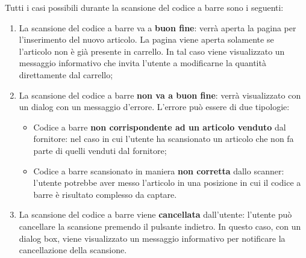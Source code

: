 Tutti i casi possibili durante la scansione del codice a barre sono i seguenti:
\begin{enumerate}
	\item La scansione del codice a barre va a \textbf{buon fine}: verrà aperta la pagina per l'inserimento del nuovo articolo. La pagina viene aperta
	solamente se l'articolo non è già presente in carrello. In tal caso viene visualizzato un messaggio informativo che invita l'utente
	a modificarne la quantità direttamente dal carrello;
	\item La scansione del codice a barre \textbf{non va a buon fine}: verrà visualizzato con un dialog con un messaggio d'errore. L'errore può
	essere di due tipologie:
		\begin{itemize}
			\item Codice a barre \textbf{non corrispondente ad un articolo venduto} dal fornitore: nel caso in cui l'utente ha scansionato un articolo
			che non fa parte di quelli venduti dal fornitore;
			\item Codice a barre scansionato in maniera \textbf{non corretta} dallo scanner: l'utente potrebbe aver messo l'articolo in una posizione
			in cui il codice a barre è risultato complesso da captare.
		\end{itemize}
	\item La scansione del codice a barre viene \textbf{cancellata} dall'utente: l'utente può cancellare la scansione premendo il pulsante indietro. In
	questo caso, con un dialog box, viene visualizzato un messaggio informativo per notificare la cancellazione della scansione.
\end{enumerate}


